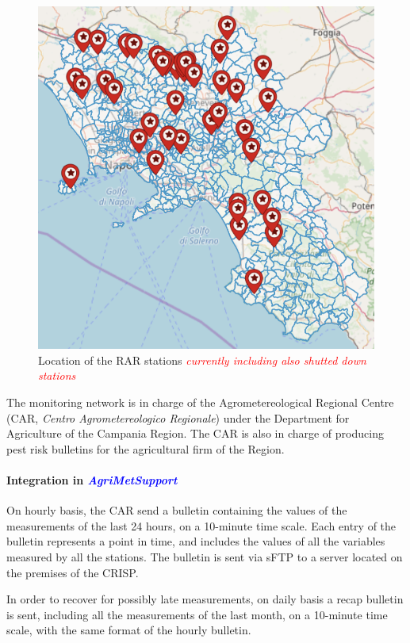 \documentclass[authoryear,preprint,review,12pt]{elsarticle}
\newcommand{\note}[1]{\emph{\textcolor{red}{#1}}}
\newcommand{\update}[1]{\emph{\textcolor{blue}{#1}}}
\newcommand{\gci}{\update{AgriMetSupport}\xspace}
\begin{document}
\begin{figure}
	\centering
	\includegraphics[scale=.8]{figures/rarLocations}
	\caption{Location of the RAR stations \note{currently including also shutted down stations}}
	\label{fig:rarLocations}
\end{figure}

The monitoring network is in charge of the Agrometereological Regional Centre (CAR, \emph{Centro Agrometereologico Regionale}) under the Department for Agriculture of the Campania Region. The CAR is also in charge of producing pest risk bulletins for the agricultural firm of the Region.

\paragraph{Integration in \gci} On hourly basis, the CAR send a bulletin containing the values of the measurements of the last 24 hours, on a 10-minute time scale. Each entry of the bulletin represents a point in time, and includes the values of all the variables measured by all the stations. The bulletin is sent via sFTP to a server located on the premises of the CRISP.

In order to recover for possibly late measurements, on daily basis a recap bulletin is sent, including all the measurements of the last month, on a 10-minute time scale, with the same format of the hourly bulletin.
\end{document}
